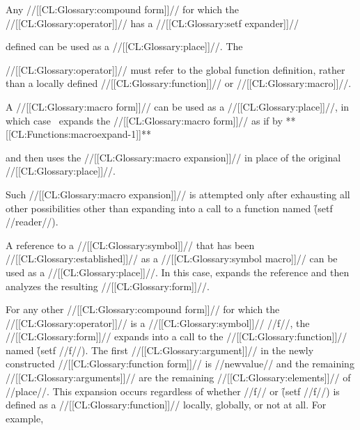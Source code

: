 Any //[[CL:Glossary:compound form]]// for which the //[[CL:Glossary:operator]]// has a
//[[CL:Glossary:setf expander]]//

defined can be used as a //[[CL:Glossary:place]]//.
The 






//[[CL:Glossary:operator]]//
must refer to the global function definition,
rather than a locally defined //[[CL:Glossary:function]]// or //[[CL:Glossary:macro]]//.



\endsubsubsection%



A //[[CL:Glossary:macro form]]// can be used as a //[[CL:Glossary:place]]//, 
in which case \clisp\ expands the //[[CL:Glossary:macro form]]//
as if by **[[CL:Functions:macroexpand-1]]**

and then uses the //[[CL:Glossary:macro expansion]]// in place of the original //[[CL:Glossary:place]]//.


Such //[[CL:Glossary:macro expansion]]// is attempted only after exhausting all other possibilities
other than expanding into a call to a function named \f{(setf //reader//)}.


\endsubsubsection%




A reference to a //[[CL:Glossary:symbol]]// that has been //[[CL:Glossary:established]]// as a //[[CL:Glossary:symbol macro]]// 
can be used as a //[[CL:Glossary:place]]//.  In this case,
 expands the reference and then analyzes the resulting //[[CL:Glossary:form]]//.


\endsubsubsection%


For any other //[[CL:Glossary:compound form]]// for which the //[[CL:Glossary:operator]]// is a
//[[CL:Glossary:symbol]]// //f//,
the  //[[CL:Glossary:form]]// expands into a call 
to the //[[CL:Glossary:function]]// named \f{(setf //f//)}.
The first //[[CL:Glossary:argument]]// in the newly constructed //[[CL:Glossary:function form]]//
is //newvalue// and the
     remaining //[[CL:Glossary:arguments]]// are the remaining //[[CL:Glossary:elements]]// of
     //place//.
This expansion occurs regardless of whether //f// or \f{(setf //f//)}
is defined as a //[[CL:Glossary:function]]// locally, globally, or not at all.
For example,

